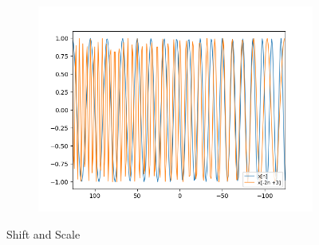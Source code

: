 \documentclass[10pt,a4paper, margin=1in]{article}
\begin{document}
\begin{figure}[H]
\begin{subfigure}[t]{0.3\linewidth}
        \includegraphics[width=1\linewidth]{assets/q7b/chirp_part_b.png}
    \end{subfigure}
    \caption{Shift and Scale}
\end{figure}
\end{document}
